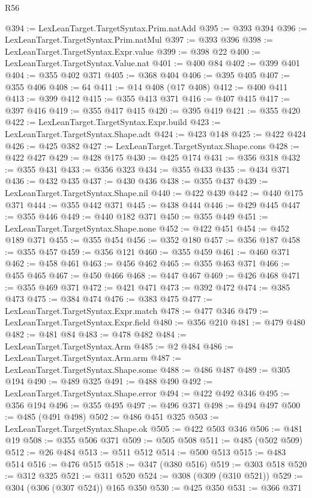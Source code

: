 \begin{lexlean}{R56}
\begin{coremodule}
@394 := LexLeanTarget.TargetSyntax.Prim.natAdd
@395 := @393 @394
@396 := LexLeanTarget.TargetSyntax.Prim.natMul
@397 := @393 @396
@398 := LexLeanTarget.TargetSyntax.Expr.value
@399 := @398 @22
@400 := LexLeanTarget.TargetSyntax.Value.nat
@401 := @400 @84
@402 := @399 @401
@404 := @355 @402 @371
@405 := @368 @404
@406 := @395 @405
@407 := @355 @406
@408 := 64
@411 := @14 @408 (@17 @408)
@412 := @400 @411
@413 := @399 @412
@415 := @355 @413 @371
@416 := @407 @415
@417 := @397 @416
@419 := @355 @417 @415
@420 := @395 @419
@421 := @355 @420
@422 := LexLeanTarget.TargetSyntax.Expr.build
@423 := LexLeanTarget.TargetSyntax.Shape.adt
@424 := @423 @148
@425 := @422 @424
@426 := @425 @382
@427 := LexLeanTarget.TargetSyntax.Shape.cons
@428 := @422 @427
@429 := @428 @175
@430 := @425 @174
@431 := @356 @318
@432 := @355 @431
@433 := @356 @323
@434 := @355 @433
@435 := @434 @371
@436 := @432 @435
@437 := @430 @436
@438 := @355 @437
@439 := LexLeanTarget.TargetSyntax.Shape.nil
@440 := @422 @439
@442 := @440 @175 @371
@444 := @355 @442 @371
@445 := @438 @444
@446 := @429 @445
@447 := @355 @446
@449 := @440 @182 @371
@450 := @355 @449
@451 := LexLeanTarget.TargetSyntax.Shape.none
@452 := @422 @451
@454 := @452 @189 @371
@455 := @355 @454
@456 := @352 @180
@457 := @356 @187
@458 := @355 @457
@459 := @356 @121
@460 := @355 @459
@461 := @460 @371
@462 := @458 @461
@463 := @456 @462
@465 := @355 @463 @371
@466 := @455 @465
@467 := @450 @466
@468 := @447 @467
@469 := @426 @468
@471 := @355 @469 @371
@472 := @421 @471
@473 := @392 @472
@474 := @385 @473
@475 := @384 @474
@476 := @383 @475
@477 := LexLeanTarget.TargetSyntax.Expr.match
@478 := @477 @346
@479 := LexLeanTarget.TargetSyntax.Expr.field
@480 := @356 @210
@481 := @479 @480
@482 := @481 @84
@483 := @478 @482
@484 := LexLeanTarget.TargetSyntax.Arm
@485 := @2 @484
@486 := LexLeanTarget.TargetSyntax.Arm.arm
@487 := LexLeanTarget.TargetSyntax.Shape.some
@488 := @486 @487
@489 := @305 @194
@490 := @489 @325
@491 := @488 @490
@492 := LexLeanTarget.TargetSyntax.Shape.error
@494 := @422 @492 @346
@495 := @356 @194
@496 := @355 @495
@497 := @496 @371
@498 := @494 @497
@500 := @485 (@491 @498)
@502 := @486 @451 @325
@503 := LexLeanTarget.TargetSyntax.Shape.ok
@505 := @422 @503 @346
@506 := @481 @19
@508 := @355 @506 @371
@509 := @505 @508
@511 := @485 (@502 @509)
@512 := @26 @484
@513 := @511 @512
@514 := @500 @513
@515 := @483 @514
@516 := @476 @515
@518 := @347 (@380 @516)
@519 := @303 @518
@520 := @312 @325
@521 := @311 @520
@524 := @308 (@309 (@310 @521))
@529 := @304 (@306 (@307 @524)) @165 @350
@530 := @425 @350
@531 := @366 @371

\end{coremodule}
\end{lexlean}
